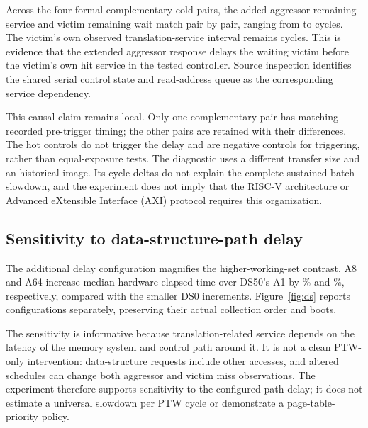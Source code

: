 Across the four formal complementary cold pairs, the added aggressor remaining service and victim remaining wait match pair by pair, ranging from \EThreeDeltaMin{} to \EThreeDeltaMax{} cycles. The victim's own observed translation-service interval remains \EThreeOwnService{} cycles. This is evidence that the extended aggressor response delays the waiting victim before the victim's own hit service in the tested controller. Source inspection identifies the shared serial control state and read-address queue as the corresponding service dependency.

This causal claim remains local. Only one complementary pair has matching recorded pre-trigger timing; the other pairs are retained with their differences. The hot controls do not trigger the delay and are negative controls for triggering, rather than equal-exposure tests. The diagnostic uses a different transfer size and an historical image. Its cycle deltas do not explain the complete sustained-batch slowdown, and the experiment does not imply that the RISC-V architecture or Advanced eXtensible Interface (AXI) protocol requires this organization.

\subsection{Sensitivity to data-structure-path delay}
The additional delay configuration magnifies the higher-working-set contrast. A8 and A64 increase median hardware elapsed time over DS50's A1 by \DSFiftyAEightElapsedExtra\% and \DSFiftyASixtyFourElapsedExtra\%, respectively, compared with the smaller DS0 increments. Figure~\ref{fig:ds} reports configurations separately, preserving their actual collection order and boots.

The sensitivity is informative because translation-related service depends on the latency of the memory system and control path around it. It is not a clean PTW-only intervention: data-structure requests include other accesses, and altered schedules can change both aggressor and victim miss observations. The experiment therefore supports sensitivity to the configured path delay; it does not estimate a universal slowdown per PTW cycle or demonstrate a page-table-priority policy.

